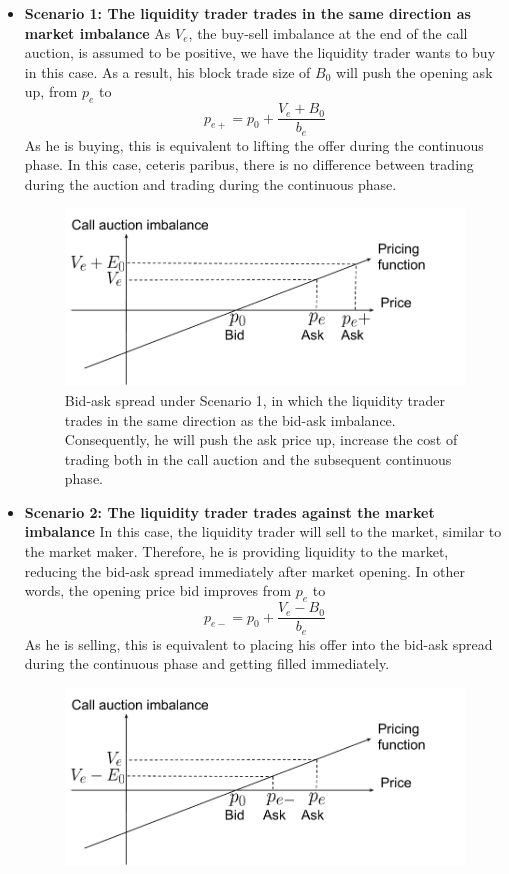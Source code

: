 \documentclass{article}
\begin{document}
\begin{itemize}
  \item {\textbf{Scenario 1: The liquidity trader trades in the same direction as market imbalance}
        As $V_e$, the buy-sell imbalance at the end of the call auction, is assumed to be positive, we have the liquidity trader wants to buy in this case. As a result, his block trade size of $B_0$ will push the opening ask up, from $p_e$ to
        \[
          p_{e+} =  p_0 + \frac{V_e + B_0}{b_e}
        \]
        As he is buying, this is equivalent to lifting the offer during the continuous phase. In this case, ceteris paribus, there is no difference between trading during the auction and trading during the continuous phase.

        \begin{figure}[h]
          \includegraphics[width=\textwidth]{MMPricingTransitionSameDir}
          \caption{Bid-ask spread under Scenario 1, in which the liquidity trader trades in the same direction as the bid-ask imbalance. Consequently, he will push the ask price up, increase the cost of trading both in the call auction and the subsequent continuous phase.}
          \label{fig:mm_pricing_transition}
        \end{figure}
        }
  \item {
        \textbf{Scenario 2: The liquidity trader trades against the market imbalance}
        In this case, the liquidity trader will sell to the market, similar to the market maker. Therefore, he is providing liquidity to the market, reducing the bid-ask spread immediately after market opening. In other words, the opening price bid improves from $p_e$ to
        \[
          p_{e-} = p_0 + \frac{V_e - B_0}{b_e}
        \]
        As he is selling, this is equivalent to placing his offer into the bid-ask spread during the continuous phase and getting filled immediately.
        \begin{figure}[h]
          \includegraphics[width=\textwidth]{MMPricingTransitionDifferentDir}

\end{figure}}
\end{itemize}
\end{document}
